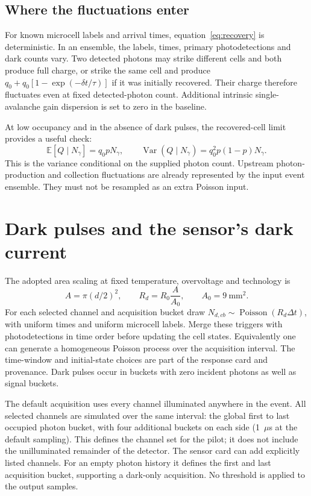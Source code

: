 \documentclass[11pt]{article}
\newcommand{\E}{\mathbb{E}}
\newcommand{\Var}{\operatorname{Var}}
\begin{document}
\subsection{Where the fluctuations enter}
For known microcell labels and arrival times, equation~\eqref{eq:recovery}
is deterministic. In an ensemble, the labels, times, primary photodetections
and dark counts vary. Two detected photons may strike different cells and
both produce full charge, or strike the same cell and produce
$q_0+q_0[1-\exp(-\delta t/\tau)]$ if it was initially recovered. Their charge
therefore fluctuates even at fixed detected-photon count. Additional
intrinsic single-avalanche gain dispersion is set to zero in the baseline.

At low occupancy and in the absence of dark pulses, the recovered-cell limit
provides a useful check:
\begin{equation}
 \E[Q\mid N_\gamma]=q_0pN_\gamma,\qquad
 \Var(Q\mid N_\gamma)=q_0^2p(1-p)N_\gamma.
 \label{eq:low-occupancy}
\end{equation}
This is the variance conditional on the supplied photon count. Upstream
photon-production and collection fluctuations are already represented by the
input event ensemble. They must not be resampled as an extra Poisson input.

\section{Dark pulses and the sensor's dark current}
The adopted area scaling at fixed temperature, overvoltage and technology is
\begin{equation}
 A=\pi(d/2)^2,\qquad
 R_d=R_0\frac{A}{A_0},\qquad A_0=9~\mathrm{mm^2}.
 \label{eq:dark-area}
\end{equation}
For each selected channel and acquisition bucket draw
$N_{d,cb}\sim\operatorname{Poisson}(R_d\Delta t)$, with uniform times and
uniform microcell labels. Merge these triggers with photodetections in time
order before updating the cell states. Equivalently one can generate a
homogeneous Poisson process over the acquisition interval. The time-window
and initial-state choices are part of the response card and provenance.
Dark pulses occur in buckets with zero incident photons as well as signal
buckets.

The default acquisition uses every channel illuminated anywhere in the event.
All selected channels are simulated over the same interval: the global first
to last occupied photon bucket, with four additional buckets on each side
(1~$\mu$s at the default sampling). This defines the channel set for the
pilot; it does not include the unilluminated remainder of the detector.
The sensor card can add explicitly listed channels. For an empty photon
history it defines the first and last acquisition bucket, supporting a
dark-only acquisition. No threshold is applied to the output samples.
\end{document}
